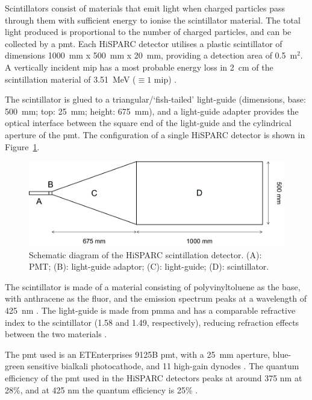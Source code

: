 Scintillators consist of materials that emit light when charged particles pass through them with sufficient energy to ionise the scintillator material. The total light produced is proportional to the number of charged particles, and can be collected by a \gls{pmt}. Each HiSPARC detector utilises a plastic scintillator of dimensions 1000~mm x 500~mm x 20~mm, providing a detection area of 0.5~$\mathrm{m}^2$. A vertically incident \gls{mip} has a most probable energy loss in 2~cm of the scintillation material of 3.51~MeV ($\equiv 1$ \gls{mip}) \citep{van_dam_hisparc_2020}.

The scintillator is glued to a triangular/`fish-tailed' light-guide (dimensions, base: 500~mm; top: 25~mm; height: 675~mm), and a light-guide adapter provides the optical interface between the square end of the light-guide and the cylindrical aperture of the \gls{pmt}. The configuration of a single HiSPARC detector is shown in Figure~\ref{fig:HS_scintillator}. 

\begin{figure}[ht!]
	\centering
	\includegraphics[width=0.75\columnwidth]{config.png}
	\caption{Schematic diagram of the HiSPARC scintillation detector. (A): PMT; (B): light-guide adaptor; (C): light-guide; (D): scintillator.}
	\label{fig:HS_scintillator}
\end{figure}

The scintillator is made of a material consisting of polyvinyltoluene as the base, with anthracene as the fluor, and the emission spectrum peaks at a wavelength of 425~nm \citep{fokkema_hisparc_2012, bartels_hisparc_2012}. The light-guide is made from \gls{pmma} and has a comparable refractive index to the scintillator (1.58 and 1.49, respectively), reducing refraction effects between the two materials \citep{van_dam_hisparc_2020}.

The \gls{pmt} used is an ETEnterprises 9125B \gls{pmt}, with a 25~mm aperture,  blue-green sensitive bialkali photocathode, and 11 high-gain dynodes \citep{bartels_hisparc_2012,et_enterprises_data_2020}. The quantum efficiency of the \gls{pmt} used in the HiSPARC detectors peaks at around 375 nm at 28\%, and at 425 nm the quantum efficiency is 25\% \citep{fokkema_hisparc_2012}. 

